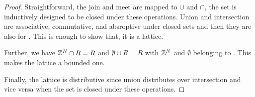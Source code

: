 \regionLattice*

\begin{proof}
  Straightforward, the join and meet are mapped to $\cup$ and $\cap$, the set is
  inductively designed to be closed under these operations. Union and
  intersection are associative, commutative, and absroptive under closed sets
  and then they are also for . This is enough to show that, it is a
  lattice.

  Further, we have $\textnormal{$\mathbb{Z}$}{}^N \cap R = R$ and $\emptyset \cup R = R$ with
  $\textnormal{$\mathbb{Z}$}{}^N$ and $\emptyset$ belonging to . This makes the lattice a
  bounded one.

  Finally, the lattice is distributive since union distributes over intersection
  and vice versa when the set is closed under these operations.
\end{proof}
